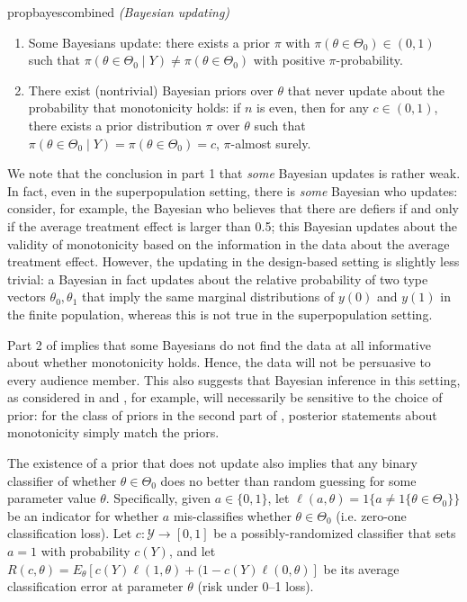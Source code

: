 \documentclass[12pt,reqno]{amsart}
\theoremstyle{theorem}
\theoremstyle{definition}
\newcommand{\0}{\mathbf{0}}
\newcommand{\1}{\mathbf{1}}
\begin{document}
\begin{restatable}{prop}{bayescombined}
\label{prop:bayescombined}
\emph{(Bayesian updating)}
\begin{enumerate}
    \item 
    Some Bayesians update: there exists a prior $\pi$ with $\pi
    (\theta \in \Theta_0) \in (0,1)$ such that $\pi(\theta \in \Theta_0 \mid Y) \neq \pi(\theta \in \Theta_0)$ with
    positive $\pi$-probability.

    \item
    There exist (nontrivial) Bayesian priors over $\theta$ that never update about the probability that monotonicity holds: if $n$ is even, then for any $c \in (0,1)$, there exists a prior distribution $\pi$ over $\theta$ such that $\pi(\theta \in \Theta_0 \mid Y) = \pi(\theta \in \Theta_0) =c$, $\pi$-almost surely.
\end{enumerate}
\end{restatable}

We note that the conclusion in part 1 that \emph{some} Bayesian updates is rather weak. In fact, even in the superpopulation setting, there is \emph{some} Bayesian who updates: consider, for example, the Bayesian who believes that there are defiers if and only if the average treatment effect is larger than 0.5; this Bayesian updates about the validity of monotonicity based on the information in the data about the average treatment effect. However, the updating in the design-based setting is slightly less trivial: a Bayesian in fact updates about the relative probability of two type vectors $\theta_0, \theta_1$ that imply the same marginal distributions of $y(0)$ and $y(1)$ in the finite population, whereas this is not true in the superpopulation setting. 

Part 2 of  implies that some Bayesians do not find the data at all informative about whether monotonicity holds. Hence, the data will not be persuasive to every audience member. This also suggests that Bayesian inference in this setting, as considered in \citet{ding_model-free_2019} and \citet{christy_counting_2025}, for example, will necessarily be sensitive to the choice of prior: for the class of priors in the second part of , posterior statements about monotonicity simply match the priors. 

The existence of a prior that does not update also implies that any binary classifier of whether $\theta \in \Theta_0$ does no better than random guessing for some parameter value $\theta$. Specifically, given $a \in \{0,1\}$, let $\ell(a,\theta) = 1\{a \neq 1\{\theta \in \Theta_0 \} \}$ be an indicator for whether $a$ mis-classifies whether $\theta \in \Theta_0$ (i.e. zero-one classification loss). Let $c: \mathcal{Y} \to [0,1]$ be a possibly-randomized classifier that sets $a=1$ with probability $c(Y)$, and let $R(c,\theta) = E_\theta[ c(Y)\ell(1,\theta) + (1-c(Y) \ell(0,\theta)]$ be its average classification error at parameter $\theta$ (risk under 0--1 loss).
\end{document}
